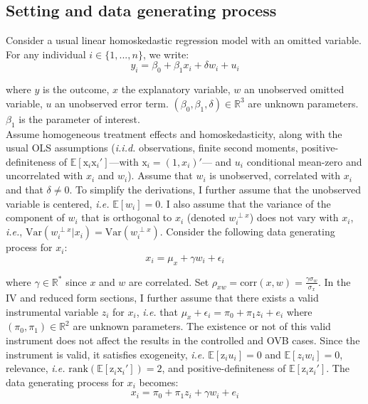 \documentclass[usletter, 12pt]{article}
\begin{document}
		\subsection{Setting and data generating process}\label{maths_dgp}
		
			Consider a usual linear homoskedastic regression model with an omitted variable. For any individual $i \in \{1, ..., n\}$, we write:
				~
				\begin{equation}\label{maths_dgp_y}
					y_i = \beta_{0} + \beta_{1}x_{i} + \delta w_{i} + u_i
				\end{equation}
				
				where $y$ is the outcome, $x$ the explanatory variable,  $w$ an unobserved omitted variable, $u$ an unobserved error term.  $(\beta_0, \beta_1, \delta) \in \mathbb{R}^{3}$ are unknown parameters. $\beta_1$ is the parameter of interest.\\
			
			Assume homogeneous treatment effects and homoskedasticity, along with the usual OLS assumptions (\textit{i.i.d.} observations, finite second moments, positive-definiteness of $\mathbb{E}[\text{x}_i \text{x}_i']$---with $\text{x}_i = (1, x_i)'$--- and $u_{i}$ conditional mean-zero and uncorrelated with $x_i$ and $w_i$). Assume that $w_{i}$ is unobserved, correlated with $x_{i}$ and that $\delta \neq 0$. To simplify the derivations, I further assume that the unobserved variable is centered, \textit{i.e.} $\mathbb{E}[w_i] = 0$. I also assume that the variance of the component of $w_{i}$ that is orthogonal to $x_{i}$ (denoted $w_{i}^{\perp x}$) does not vary with $x_{i}$, \textit{i.e.}, $\text{Var}(w_{i}^{\perp x}|x_{i}) = \text{Var}(w_{i}^{\perp x})$. Consider the following data generating process for $x_i$:
				~
				\begin{equation}\label{maths_dgp_x}
					x_i = \mu_{x} + \gamma w_{i} + \epsilon_i
				\end{equation}
				
				where $\gamma \in \mathbb{R}^{*}$ since $x$ and $w$ are correlated. Set $\rho_{xw} = \text{corr}(x, w) =  \frac{\gamma \sigma_{w}}{\sigma_{x}}$. In the IV and reduced form sections, I further assume that there exists a valid instrumental variable $z_i$ for $x_i$, \textit{i.e.} that $\mu_x + \epsilon_{i} = \pi_0 + \pi_1 z_i + e_{i}$  where $(\pi_0, \pi_1) \in \mathbb{R}^{2}$ are unknown parameters. The existence or not of this valid instrument does not affect the results in the controlled and \textsc{OVB} cases. Since the instrument is valid, it satisfies exogeneity, \textit{i.e.} $\mathbb{E}[\text{z}_{i}u_{i}] = 0$ and  $\mathbb{E}[z_{i}w_{i}] = 0$, relevance, \textit{i.e.} $\text{rank}(\mathbb{E}[\text{z}_{i}\text{x}_i']) = 2$,  and positive-definiteness of $\mathbb{E}[\text{z}_i \text{z}_i']$. The data generating process for $x_i$ becomes:			
				~
				\begin{equation}\label{maths_dgp_x_iv}
					x_i = \pi_0 + \pi_1 z_i + \gamma w_{i} + e_{i}
				\end{equation}
				
\end{document}

